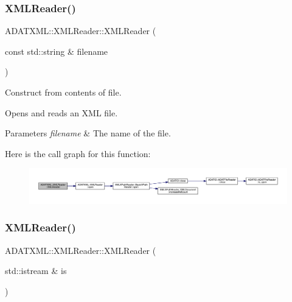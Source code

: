 \subsubsection{\texorpdfstring{XMLReader()}{XMLReader()}\hspace{0.1cm}{\footnotesize\ttfamily [12/15]}}
{\footnotesize\ttfamily A\+D\+A\+T\+X\+M\+L\+::\+X\+M\+L\+Reader\+::\+X\+M\+L\+Reader (\begin{DoxyParamCaption}\item[{const std\+::string \&}]{filename }\end{DoxyParamCaption})\hspace{0.3cm}{\ttfamily [inline]}}



Construct from contents of file. 

Opens and reads an X\+ML file. 
\begin{DoxyParams}{Parameters}
{\em filename} & The name of the file. \\
\hline
\end{DoxyParams}
Here is the call graph for this function\+:
\nopagebreak
\begin{figure}[H]
\begin{center}
\leavevmode
\includegraphics[width=350pt]{db/d3f/classADATXML_1_1XMLReader_a85d8af8a27febdd66251e20bd96ccc32_cgraph}
\end{center}
\end{figure}
\mbox{\label{classADATXML_1_1XMLReader_a8025cb1c53d6ceb8a694bdbd8e1f383b}} 
\subsubsection{\texorpdfstring{XMLReader()}{XMLReader()}\hspace{0.1cm}{\footnotesize\ttfamily [13/15]}}
{\footnotesize\ttfamily A\+D\+A\+T\+X\+M\+L\+::\+X\+M\+L\+Reader\+::\+X\+M\+L\+Reader (\begin{DoxyParamCaption}\item[{std\+::istream \&}]{is }\end{DoxyParamCaption})\hspace{0.3cm}{\ttfamily [inline]}}




